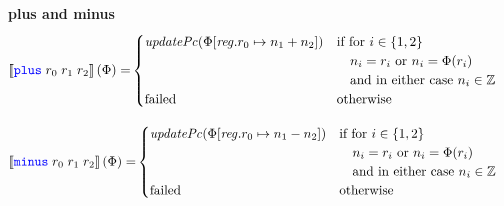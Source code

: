 \documentclass[a4paper]{article}
\newcommand{\sem}[1]{\left\llbracket #1 \right\rrbracket}
\newcommand{\sourcecolor}[1]{\color{blue}}
\newcommand{\src}[1]{{\sourcecolor{} #1}}
\newcommand{\zinstr}[1]{\texttt{#1}}
\newcommand{\threeinstr}[4]{
  \ifthenelse{\equal{#2#3#4}{}}
  {\zinstr{#1}}
  {\zinstr{#1} \; #2 \; #3 \; #4}
}
\newcommand{\splus}[3]{\threeinstr{\src{plus}}{#1}{#2}{#3}}
\newcommand{\sminus}[3]{\threeinstr{\src{minus}}{#1}{#2}{#3}}
\newcommand{\ints}{\mathbb{Z}}
\newcommand{\update}[2]{[#1 \mapsto #2]}
\newcommand{\updReg}[2]{\update{\reg.#1}{#2}}
\newcommand{\failed}{\mathrm{failed}}
\newcommand{\var}[1]{\mathit{#1}}
\newcommand{\reg}{\var{reg}}
\newcommand{\plainfun}[2]{
  \ifthenelse{\equal{#2}{}}
  {\mathit{#1}}
  {\mathit{#1}(#2)}
}
\newcommand{\updPcAddr}[1]{\plainfun{updatePc}{#1}}
\begin{document}
\noindent\textbf{plus and minus}\\
\begin{align*}
  \sem{\splus{r_0}{r_1}{r_2}}(\Phi) = &
                                                  \begin{cases}
                                                    \updPcAddr{\Phi\updReg{r_0}{n_1+n_2}} &
                                                    \arraycolsep=0pt
                                                    \begin{array}[t]{l}
                                                      \text{if for $i \in \{1,2\}$}\\
                                                      \quad\text{$n_i = r_i$ or $n_i = \Phi(r_i)$}\\
                                                      \quad\text{and in either case $n_i \in \ints$}\\
                                                    \end{array}\\
                                                    \failed & \text{otherwise}
                                                  \end{cases}  
\end{align*}

\begin{align*}
  \sem{\sminus{r_0}{r_1}{r_2}}(\Phi) = &
                                                  \begin{cases}
                                                    \updPcAddr{\Phi\updReg{r_0}{n_1-n_2}} &
                                                    \arraycolsep=0pt
                                                    \begin{array}[t]{l}
                                                      \text{if for $i \in \{1,2\}$}\\
                                                      \quad\text{$n_i = r_i$ or $n_i = \Phi(r_i)$}\\
                                                      \quad\text{and in either case $n_i \in \ints$}\\
                                                    \end{array}\\
                                                    \failed & \text{otherwise}
                                                  \end{cases}  
\end{align*}
\end{document}

